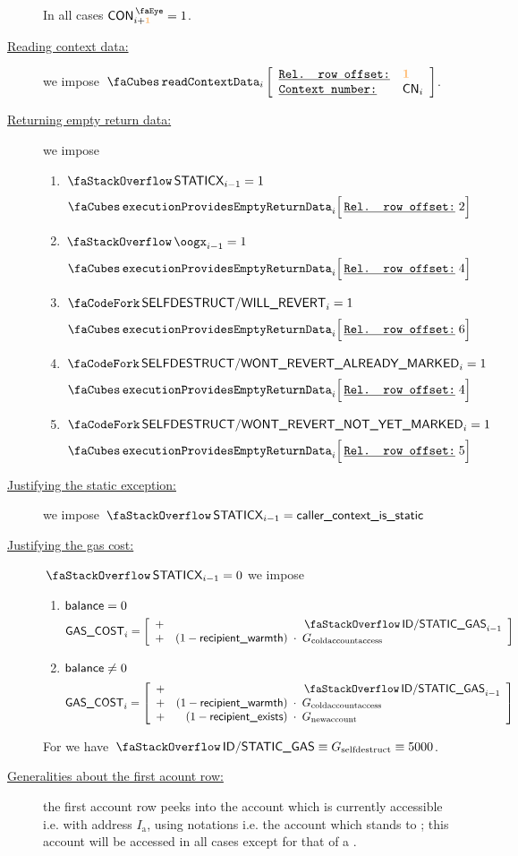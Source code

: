 \begin{description}
		\saNote{} In all cases $\peekContext  _{i + \locFirstContextRow} = 1$.
	\item[\underline{Reading context data:}]
		we impose $\readContextData {i}{\locFirstContextRow}{\cn_{i}}$.
	\item[\underline{Returning empty return data:}]
		we impose
		\begin{enumerate}
			\item \If $\stackStaticx_{i - 1} = 1$                        \Then \[ \executionProvidesEmptyReturnData {i}{2}  \]
			\item \If $\stackOogx_{i - 1} = 1$                           \Then \[ \executionProvidesEmptyReturnData {i}{4}  \]
			\item \If $\scenSelfdestructWillRevert_{i} = 1$              \Then \[ \executionProvidesEmptyReturnData {i}{6}  \]
			\item \If $\scenSelfdestructWontRevertAlreadyMarked_{i} = 1$ \Then \[ \executionProvidesEmptyReturnData {i}{4}  \]
			\item \If $\scenSelfdestructWontRevertNotYetMarked_{i} = 1$  \Then \[ \executionProvidesEmptyReturnData {i}{5}  \]
		\end{enumerate}
	\item[\underline{Justifying the static exception:}]
		we impose $\stackStaticx_{i - 1} = \locIsStatic$
	\item[\underline{Justifying the gas cost:}]
		\If $\stackStaticx_{i - 1} = 0$ \Then we impose
		\begin{enumerate}
			\item \If $\textsf{balance} =    0$ \Then
				\[
					\gasCost_{i} =
					\left[ \begin{array}{crcl}
						+ &                           & \!\!\!       \!\!\! & \stackStaticGas _{i - 1}   \\
						+ & (1 - \locRecipientWarmth) & \!\!\! \cdot \!\!\! & G_\text{coldaccountaccess} \\
					\end{array} \right]
				\]
			\item \If $\textsf{balance} \neq 0$ \Then
				\[
					\gasCost_{i} =
					\left[ \begin{array}{crcl}
						+ &                           & \!\!\!       \!\!\! & \stackStaticGas _{i - 1}   \\
						+ & (1 - \locRecipientWarmth) & \!\!\! \cdot \!\!\! & G_\text{coldaccountaccess} \\
						+ & (1 - \locRecipientExists) & \!\!\! \cdot \!\!\! & G_\text{newaccount}        \\
					\end{array} \right]
				\]
		\end{enumerate}
		\saNote{}
		For  we have $\stackStaticGas \equiv G_\text{selfdestruct} \equiv 5000$.
	\item[\underline{Generalities about the first acount row:}]
		the first account row peeks into the account which is currently accessible i.e. with address $I_\text{a}$, using \cite{EYP} notations i.e. the account which stands to ;
		this account will be accessed in all cases except for that of a \staticxSH{}.


\end{description}
